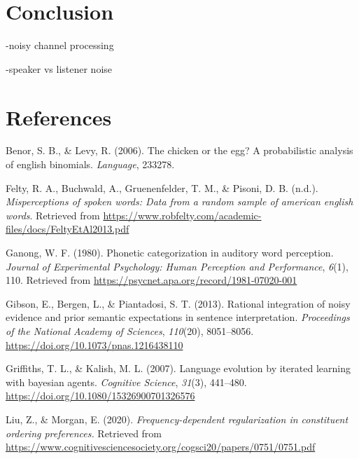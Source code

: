 \documentclass[
  jou,floatsintext]{apa6}
\newlength{\cslhangindent}
\newenvironment{CSLReferences}[2] %
 {\begin{list}{}{%
  \setlength{\itemindent}{0pt}
  \setlength{\leftmargin}{0pt}
  \setlength{\parsep}{0pt}
  \ifodd #1
   \setlength{\leftmargin}{\cslhangindent}
   \setlength{\itemindent}{-1\cslhangindent}
  \fi
  \setlength{\itemsep}{#2\baselineskip}}}
 {\end{list}}
\begin{document}
\section{Conclusion}\label{conclusion}

-noisy channel processing

-speaker vs listener noise

\newpage

\section{References}\label{references}

\label{refs}
\begin{CSLReferences}{1}{0}
Benor, S. B., \& Levy, R. (2006). The chicken or the egg? A probabilistic analysis of english binomials. \emph{Language}, 233278.

Felty, R. A., Buchwald, A., Gruenenfelder, T. M., \& Pisoni, D. B. (n.d.). \emph{Misperceptions of spoken words: Data from a random sample of american english words}. Retrieved from \url{https://www.robfelty.com/academic-files/docs/FeltyEtAl2013.pdf}

Ganong, W. F. (1980). Phonetic categorization in auditory word perception. \emph{Journal of Experimental Psychology: Human Perception and Performance}, \emph{6}(1), 110. Retrieved from \url{https://psycnet.apa.org/record/1981-07020-001}

Gibson, E., Bergen, L., \& Piantadosi, S. T. (2013). Rational integration of noisy evidence and prior semantic expectations in sentence interpretation. \emph{Proceedings of the National Academy of Sciences}, \emph{110}(20), 8051--8056. \url{https://doi.org/10.1073/pnas.1216438110}

Griffiths, T. L., \& Kalish, M. L. (2007). Language evolution by iterated learning with bayesian agents. \emph{Cognitive Science}, \emph{31}(3), 441--480. \url{https://doi.org/10.1080/15326900701326576}

Liu, Z., \& Morgan, E. (2020). \emph{Frequency-dependent regularization in constituent ordering preferences.} Retrieved from \url{https://www.cognitivesciencesociety.org/cogsci20/papers/0751/0751.pdf}


\end{CSLReferences}
\end{document}
